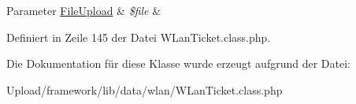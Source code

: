 \begin{DoxyParams}[1]{Parameter}
\mbox{\hyperlink{class_file_upload}{File\+Upload}} & {\em \$file} & \\
\hline
\end{DoxyParams}


Definiert in Zeile 145 der Datei W\+Lan\+Ticket.\+class.\+php.



Die Dokumentation für diese Klasse wurde erzeugt aufgrund der Datei\+:\begin{DoxyCompactItemize}
\item 
Upload/framework/lib/data/wlan/W\+Lan\+Ticket.\+class.\+php\end{DoxyCompactItemize}

